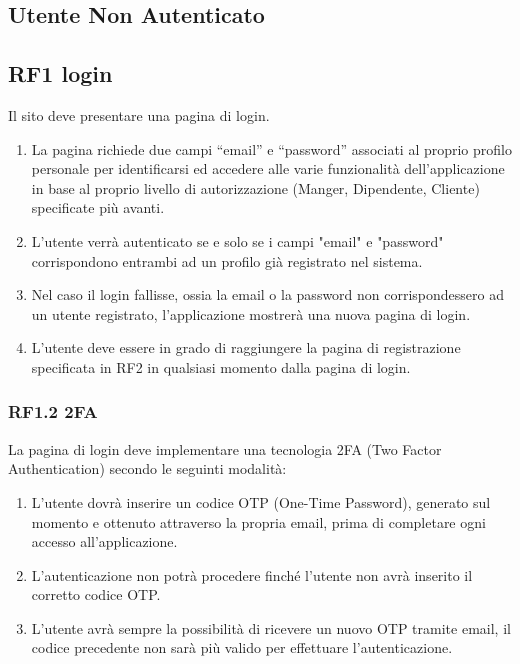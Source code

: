 \documentclass{report}
\begin{document}
\subsection{Utente Non Autenticato}

\subsection*{RF1 login}
Il sito deve presentare una pagina di login.
\begin{enumerate}
	\item La pagina richiede due campi “email” e “password” associati al proprio profilo personale per identificarsi ed accedere alle varie funzionalità dell’applicazione in base al proprio livello di autorizzazione (Manger, Dipendente, Cliente) specificate più avanti.
	
	\item L'utente verrà autenticato se e solo se i campi "email" e "password" corrispondono entrambi ad un profilo già registrato nel sistema.
	
	\item Nel caso il login fallisse, ossia la email o la password non corrispondessero ad un utente registrato, l’applicazione mostrerà una nuova pagina di login.
	
	\item L’utente deve essere in grado di raggiungere la pagina di registrazione specificata in RF2 in qualsiasi momento dalla pagina di login.
	
\end{enumerate}

	\subsubsection{RF1.2 2FA}
	La pagina di login deve implementare una tecnologia 2FA (Two Factor Authentication) secondo le seguinti modalità:
	
	\begin{enumerate}
	\item L’utente dovrà inserire un codice OTP (One-Time Password), generato sul momento e ottenuto attraverso la propria email, prima di completare ogni accesso all’applicazione. 
	
	\item 	L’autenticazione non potrà procedere finché l’utente non avrà inserito il corretto codice OTP.
	
	\item L’utente avrà sempre la possibilità di ricevere un nuovo OTP tramite email, il codice precedente non sarà più valido per effettuare l’autenticazione.

	\end{enumerate}
	
\end{document}
